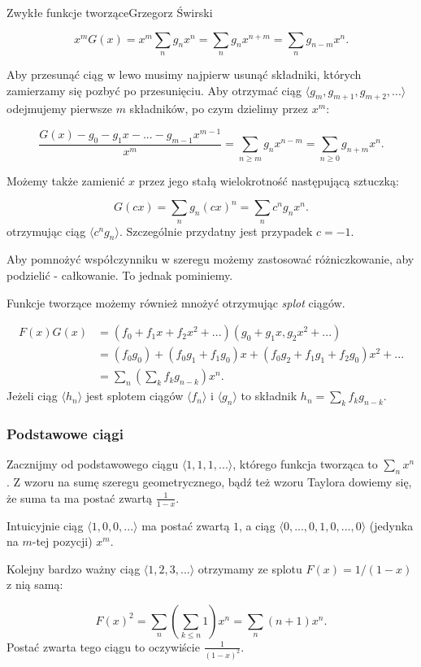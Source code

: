\begin{referat}{Zwykłe funkcje tworzące}{Grzegorz Świrski}
\begin{teoria}
$$x^mG(x) = x^m \sum_n g_n x^n = \sum_n g_n x^{n+m} = \sum_n g_{n-m}x^n.$$

Aby przesunąć ciąg w lewo musimy najpierw usunąć składniki, których
zamierzamy się pozbyć po przesunięciu. Aby otrzymać ciąg $\langle g_m, g_{m+1}, g_{m+2}, ... \rangle$ odejmujemy pierwsze $m$ składników, po czym dzielimy przez $x^m$:

$$\frac{G(x) - g_0 - g_1x - ... - g_{m-1}x^{m-1}}{x^m} 
= \sum_{n \geqslant m} g_n x^{n-m} = \sum_{n \geqslant 0} g_{n+m}x^n.$$

Możemy także zamienić $x$ przez jego stałą wielokrotność następującą sztuczką:

$$G(cx) = \sum_n g_n (cx)^n = \sum_n c^n g_n x^n.$$
otrzymując ciąg $\langle c^ng_n \rangle$. Szczególnie przydatny jest przypadek 
$c = -1$.

Aby pomnożyć współczynniku w szeregu możemy zastosować różniczkowanie,
aby podzielić - całkowanie. To jednak pominiemy.

Funkcje tworzące możemy również mnożyć otrzymując \emph{splot} ciągów.

\begin{align*}
  F(x)G(x) &= (f_0 + f_1x + f_2x^2 + ...)(g_0 + g_1x, g_2x^2+ ...) \\
           &= (f_0g_0) + (f_0g_1 + f_1g_0)x + (f_0g_2 + f_1g_1 + f_2g_0)x^2 + ... \\
           &= \sum_n (\sum_k f_k g_{n-k})x^n.
\end{align*}
Jeżeli ciąg $\langle h_n \rangle$ jest splotem ciągów $\langle f_n \rangle$
i $\langle g_n \rangle$ to składnik $h_n = \sum_k f_k g_{n-k}$.

\subsubsection{Podstawowe ciągi}

Zacznijmy od podstawowego ciągu $\langle 1,1,1,... \rangle$, którego funkcja tworząca
to $\sum_n x^n$. Z wzoru na sumę szeregu geometrycznego, bądź też wzoru
Taylora dowiemy się, że suma ta ma postać zwartą $\frac{1}{1-x}$.

Intuicyjnie ciąg $\langle 1,0,0,... \rangle$ ma postać zwartą $1$, a ciąg
$\langle 0,...,0, 1, 0, ..., 0 \rangle$ (jedynka na $m$-tej pozycji) $x^m$.

Kolejny bardzo ważny ciąg $\langle 1,2,3,... \rangle$ otrzymamy ze splotu
$F(x) = 1/(1-x)$ z nią samą:

$$F(x)^2 = \sum_n (\sum_{k \leqslant  n} 1)x^n = \sum_n (n+1)x^n.$$
Postać zwarta tego ciągu to oczywiście $\frac{1}{(1-x)^2}$.


\end{teoria}
\end{referat}
